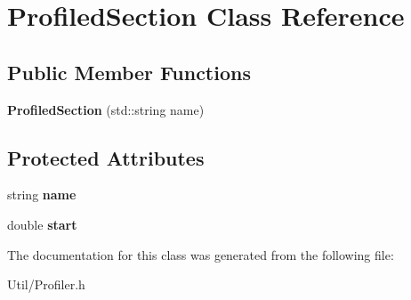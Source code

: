 \hypertarget{class_profiled_section}{
\section{\-Profiled\-Section \-Class \-Reference}
\label{class_profiled_section}
}
\subsection*{\-Public \-Member \-Functions}
\begin{DoxyCompactItemize}
\item 
\hypertarget{class_profiled_section_a19f4ad2ae1f348309f0d5169fea83e57}{
{\bfseries \-Profiled\-Section} (std\-::string name)}
\label{class_profiled_section_a19f4ad2ae1f348309f0d5169fea83e57}

\end{DoxyCompactItemize}
\subsection*{\-Protected \-Attributes}
\begin{DoxyCompactItemize}
\item 
\hypertarget{class_profiled_section_ae02896dd4964d227e3557dd47387580f}{
string {\bfseries name}}
\label{class_profiled_section_ae02896dd4964d227e3557dd47387580f}

\item 
\hypertarget{class_profiled_section_a36b51e1d06631a8b00ecd587bc236165}{
double {\bfseries start}}
\label{class_profiled_section_a36b51e1d06631a8b00ecd587bc236165}

\end{DoxyCompactItemize}


\-The documentation for this class was generated from the following file\-:\begin{DoxyCompactItemize}
\item 
\-Util/\-Profiler.\-h\end{DoxyCompactItemize}
